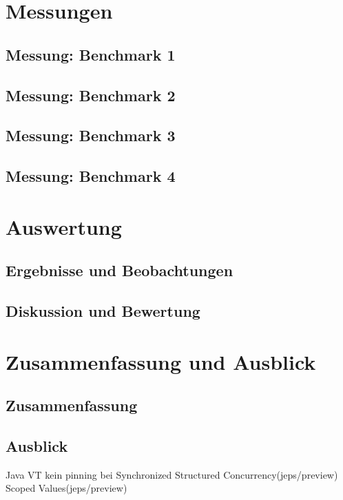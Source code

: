 \documentclass[fontsize=12pt,paper=a4,twoside=semi,parskip=half-,headsepline,headinclude]{scrreprt}
\begin{document}
\chapter{Messungen}

\section{Messung: Benchmark 1}

\section{Messung: Benchmark 2}

\section{Messung: Benchmark 3}

\section{Messung: Benchmark 4}



\chapter{Auswertung}

\section{Ergebnisse und Beobachtungen}

\section{Diskussion und Bewertung}



\chapter{Zusammenfassung und Ausblick}

\section{Zusammenfassung}

\section{Ausblick}
Java VT kein pinning bei Synchronized
Structured Concurrency(jeps/preview)
Scoped Values(jeps/preview)
\end{document}
